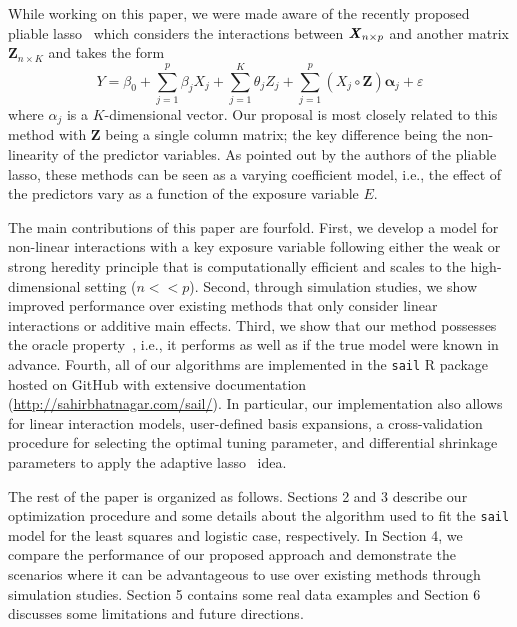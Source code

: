 \documentclass[12pt,letter]{article}\usepackage[]{graphicx}\usepackage[]{color}
\newcommand{\bX}{\textbf{\emph{X}}}
\newcommand{\balpha}{\boldsymbol{\alpha}}
\begin{document}
While working on this paper, we were made aware of the recently proposed pliable lasso~\citep{tibshirani2017pliable} which considers the interactions between $\bX_{n \times p}$ and another matrix $\mathbf{Z}_{n\times K}$ and takes the form
\[Y = \beta_0 + \sum_{j=1}^{p}\beta_j X_j + \sum_{j=1}^{K}\theta_j Z_j + \sum_{j=1}^{p} (X_j \circ \mathbf{Z}) \balpha_j + \varepsilon  \] where $\alpha_j$ is a $K$-dimensional vector. Our proposal is most closely related to this method with $\mathbf{Z}$ being a single column matrix; the key difference being the non-linearity of the predictor variables. 
As pointed out by the authors of the pliable lasso, these methods can be seen as a varying coefficient model, i.e., the effect of the predictors vary as a function of the exposure variable $E$. 

The main contributions of this paper are fourfold. 
First, we develop a model for non-linear interactions with a key exposure variable following either the weak or strong heredity principle that is computationally efficient and scales to the high-dimensional setting ($n << p$). 
Second, through simulation studies, we show improved performance over existing methods that only consider linear interactions or additive main effects. 
Third, we show that our method possesses the oracle property~\citep{fan2001variable}, i.e., it performs as well as if the true model were known in advance. 
Fourth, all of our algorithms are implemented in the \texttt{sail} R package hosted on GitHub with extensive documentation (\url{http://sahirbhatnagar.com/sail/}). In particular, our implementation also allows for linear interaction models, user-defined basis expansions, a cross-validation procedure for selecting the optimal tuning parameter, and differential shrinkage parameters to apply the adaptive lasso~\citep{zou2006adaptive} idea. 

The rest of the paper is organized as follows. Sections 2 and 3 describe our optimization procedure and some details about the algorithm used to fit the \texttt{sail} model for the least squares and logistic case, respectively. In Section 4, we compare the performance of our proposed approach and demonstrate the scenarios where it can be advantageous to use over existing methods through simulation studies. Section 5 contains some real data examples and Section 6 discusses some limitations and future directions. 
\end{document}

